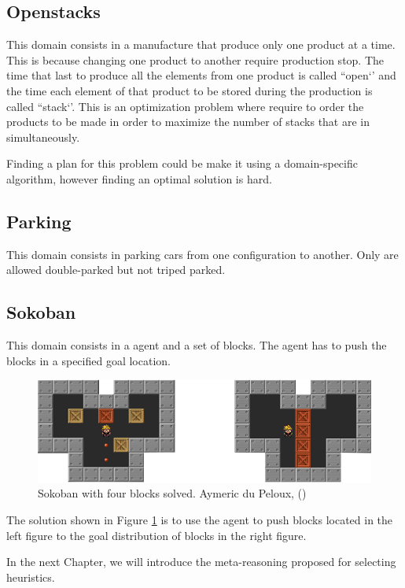 \subsection{Openstacks}
This domain consists in a manufacture that produce only one product at a time. This is because changing one product to another require production stop. The time that last to produce all the elements from one product is called ``open‘’ and the time each element of that product to be stored during the production is called ``stack‘’. This is an optimization problem where require to order the products to be made in order to maximize the number of stacks that are in simultaneously.

Finding a plan for this problem could be make it using a domain-specific algorithm, however finding an optimal solution is hard.

\subsection{Parking}
This domain consists in parking cars from one configuration to another. Only are allowed double-parked but not triped parked.

\subsection{Sokoban}
This domain consists in a agent and a set of blocks. The agent has to push the blocks in a specified goal location.

\begin{figure}[!htb]
\begin{center}
  \includegraphics[width=12cm,scale=0.5]{images/sokoban_star_end}
\end{center}
\caption{Sokoban with four blocks solved. Aymeric du Peloux, (\citeyear{sokoban2010})}\label{fig:img_sokoban_solved}
\end{figure}

The solution shown in Figure \ref{fig:img_sokoban_solved} is to use the agent to push blocks located in the left figure to the goal distribution of blocks in the right figure.

\bigskip

In the next Chapter, we will introduce the meta-reasoning proposed for selecting heuristics.

\clearpage